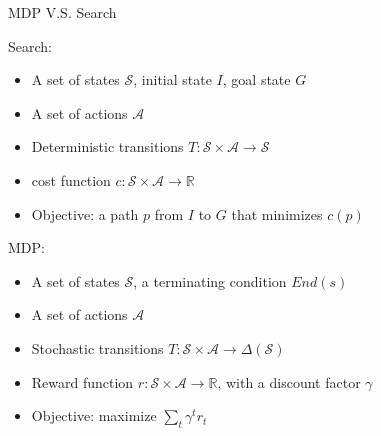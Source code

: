 \documentclass{beamer}
\begin{document}
\begin{frame}{MDP V.S. Search}
    \begin{exampleblock}{Search:}
        \begin{itemize}
            \item A set of states $\mathcal{S}$, initial state $I$, goal state $G$

            \item A set of actions $\mathcal{A}$

            \item Deterministic transitions $T: \mathcal{S} \times \mathcal{A} \rightarrow \mathcal{S}$

            \item cost function $c: \mathcal{S} \times \mathcal{A} \rightarrow \mathbb{R}$

            \item Objective: a path $p$ from $I$ to $G$ that minimizes $c(p)$
        \end{itemize}
    \end{exampleblock}

    \pause
    \begin{exampleblock}{MDP:}
        \begin{itemize}
            \item A set of states $\mathcal{S}$, a terminating condition $End(s)$

            \item A set of actions $\mathcal{A}$

            \item Stochastic transitions $T: \mathcal{S} \times \mathcal{A} \rightarrow \Delta(\mathcal{S})$

            \item Reward function $r: \mathcal{S} \times \mathcal{A} \rightarrow \mathbb{R}$, with a discount factor $\gamma$

            \item Objective: maximize $\sum_t \gamma^t r_t$
        \end{itemize}
    \end{exampleblock}
\end{frame}
\end{document}
